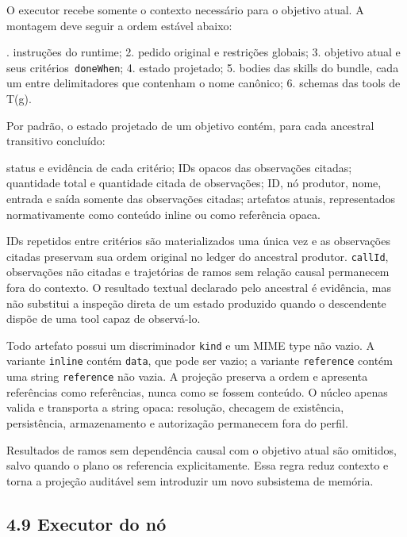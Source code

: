 \documentclass[12pt,a4paper]{article}
\begin{document}
O executor recebe somente o contexto necessário para o objetivo atual. A montagem deve seguir a ordem estável abaixo:


. instruções do runtime; 2. pedido original e restrições globais; 3. objetivo atual e seus critérios\texttt{ doneWhen}; 4. estado projetado; 5. bodies das skills do bundle, cada um entre delimitadores que contenham o nome canônico; 6. schemas das tools de T(g).\par

Por padrão, o estado projetado de um objetivo contém, para cada ancestral transitivo concluído:


\noindent \textbullet{} status e evidência de cada critério; \textbullet{} IDs opacos das observações citadas; \textbullet{} quantidade total e quantidade citada de observações; \textbullet{} ID, nó produtor, nome, entrada e saída somente das observações citadas; \textbullet{} artefatos atuais, representados normativamente como conteúdo inline ou como referência opaca.\par

IDs repetidos entre critérios são materializados uma única vez e as observações citadas preservam sua ordem original no ledger do ancestral produtor. \texttt{callId}, observações não citadas e trajetórias de ramos sem relação causal permanecem fora do contexto. O resultado textual declarado pelo ancestral é evidência, mas não substitui a inspeção direta de um estado produzido quando o descendente dispõe de uma tool capaz de observá-lo.

Todo artefato possui um discriminador \texttt{kind} e um MIME type não vazio. A variante \texttt{inline} contém \texttt{data}, que pode ser vazio; a variante \texttt{reference} contém uma string \texttt{reference} não vazia. A projeção preserva a ordem e apresenta referências como referências, nunca como se fossem conteúdo. O núcleo apenas valida e transporta a string opaca: resolução, checagem de existência, persistência, armazenamento e autorização permanecem fora do perfil.

Resultados de ramos sem dependência causal com o objetivo atual são omitidos, salvo quando o plano os referencia explicitamente. Essa regra reduz contexto e torna a projeção auditável sem introduzir um novo subsistema de memória.



\subsection*{4.9 Executor do nó}
\end{document}
